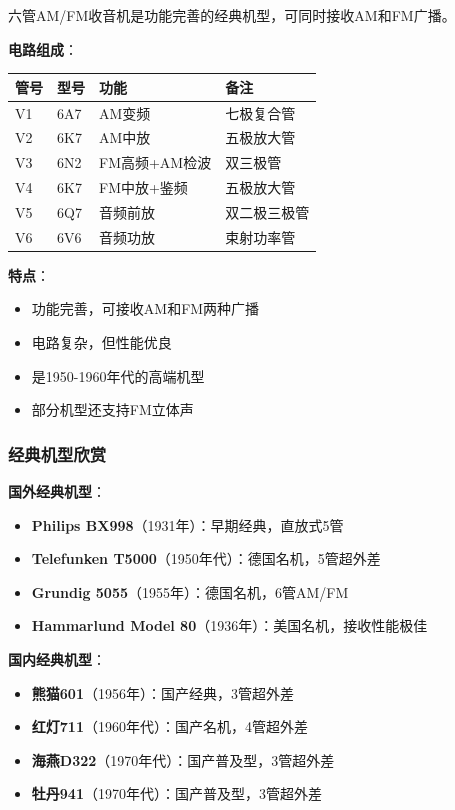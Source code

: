 六管AM/FM收音机是功能完善的经典机型，可同时接收AM和FM广播。

\textbf{电路组成}：
\begin{center}
\begin{tabular}{|p{2cm}|p{3cm}|p{4cm}|p{4cm}|}
\hline
\textbf{管号} & \textbf{型号} & \textbf{功能} & \textbf{备注} \\
\hline
V1 & 6A7 & AM变频 & 七极复合管 \\
V2 & 6K7 & AM中放 & 五极放大管 \\
V3 & 6N2 & FM高频+AM检波 & 双三极管 \\
V4 & 6K7 & FM中放+鉴频 & 五极放大管 \\
V5 & 6Q7 & 音频前放 & 双二极三极管 \\
V6 & 6V6 & 音频功放 & 束射功率管 \\
\hline
\end{tabular}
\end{center}

\textbf{特点}：
\begin{itemize}
    \item 功能完善，可接收AM和FM两种广播
    \item 电路复杂，但性能优良
    \item 是1950-1960年代的高端机型
    \item 部分机型还支持FM立体声
\end{itemize}

\subsubsection{经典机型欣赏}
\label{sec:classic_models}

\textbf{国外经典机型}：
\begin{itemize}
    \item \textbf{Philips BX998}（1931年）：早期经典，直放式5管
    \item \textbf{Telefunken T5000}（1950年代）：德国名机，5管超外差
    \item \textbf{Grundig 5055}（1955年）：德国名机，6管AM/FM
    \item \textbf{Hammarlund Model 80}（1936年）：美国名机，接收性能极佳
\end{itemize}

\textbf{国内经典机型}：
\begin{itemize}
    \item \textbf{熊猫601}（1956年）：国产经典，3管超外差
    \item \textbf{红灯711}（1960年代）：国产名机，4管超外差
    \item \textbf{海燕D322}（1970年代）：国产普及型，3管超外差
    \item \textbf{牡丹941}（1970年代）：国产普及型，3管超外差
\end{itemize}

